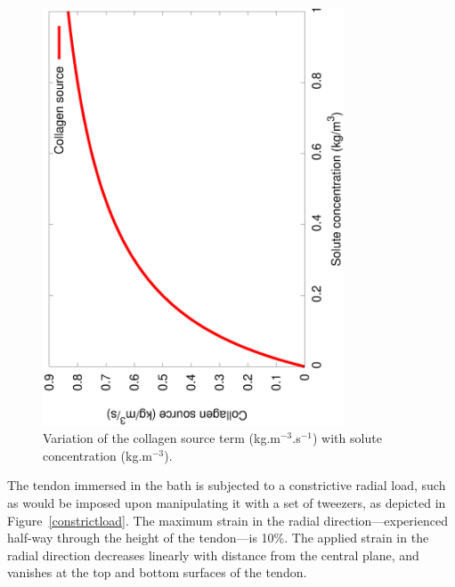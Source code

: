 \begin{figure}[!hpt]
\centering
\includegraphics[angle=270,width=0.8\textwidth]{images/elucidation/enzyme-kinetics}
\caption{Variation of the collagen source term (kg.m$^{-3}$.s$^{-1}$)
  with solute concentration (kg.m$^{-3}$).}
\label{eg3menten}
\end{figure}

The tendon immersed in the bath is subjected to a constrictive
radial load, such
as would be imposed upon  manipulating it with a set of tweezers, as depicted in
Figure~\ref{constrictload}. The
maximum strain in the radial 
direction---experienced half-way through the height of the tendon---is
10\%. The applied strain in the radial direction decreases linearly
with distance from the central plane, and vanishes at the top and
bottom surfaces of the tendon. 


